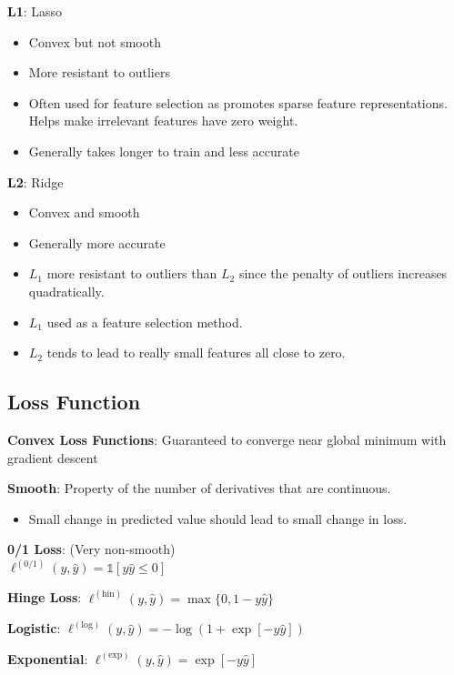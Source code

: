 \documentclass[10pt]{article}
\begin{document}
\begin{multicols}{3}
  \textbf{L1}: Lasso
  \begin{itemize}
    \item Convex but not smooth
    \item More resistant to outliers
    \item Often used for feature selection as promotes sparse feature representations.  Helps make irrelevant features have zero weight.
    \item Generally takes longer to train and less accurate
  \end{itemize}

  \textbf{L2}: Ridge
  \begin{itemize}
    \item Convex and smooth
    \item Generally more accurate
  \end{itemize}

  \begin{itemize}
    \item $L_1$ more resistant to outliers than $L_2$ since the penalty of outliers increases quadratically.
    \item $L_1$ used as a feature selection method.
    \item $L_2$ tends to lead to really small features all close to zero.
  \end{itemize}

  \subsection{Loss Function}

  \textbf{Convex Loss Functions}: Guaranteed to converge near global minimum with gradient descent

  \textbf{Smooth}: Property of the number of derivatives that are continuous.
  \begin{itemize}
    \item Small change in predicted value should lead to small change in loss.
  \end{itemize}

  \textbf{0/1 Loss}: (Very non-smooth)\\
  $ \ell^{(\text{0/1})}(y,\hat{y}) = \mathbb{1}[y\hat{y} \leq 0] $

  \textbf{Hinge Loss}:
  $ \ell^{(\text{hin})}(y,\hat{y}) = \max\{0, 1-y\hat{y}\} $

  \textbf{Logistic}:
  $ \ell^{(\text{log})}(y,\hat{y}) = -\log(1+\exp[-y\hat{y}]) $

  \textbf{Exponential}:
  $ \ell^{(\text{exp})}(y,\hat{y}) = \exp[-y\hat{y}] $


\end{multicols}
\end{document}

